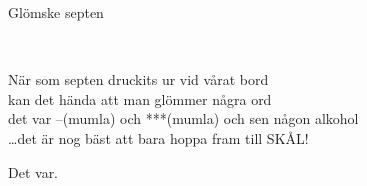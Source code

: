 \begin{song}{Glömske septen}
	
	
	\\
	
	När som septen druckits ur vid vårat bord\\
	kan det hända att man glömmer några ord\\
	det var --(mumla) och ***(mumla) och sen någon alkohol\\
	\ldots{}det är nog bäst att bara hoppa fram till SKÅL!
	
	Det var.
	
\end{song}
